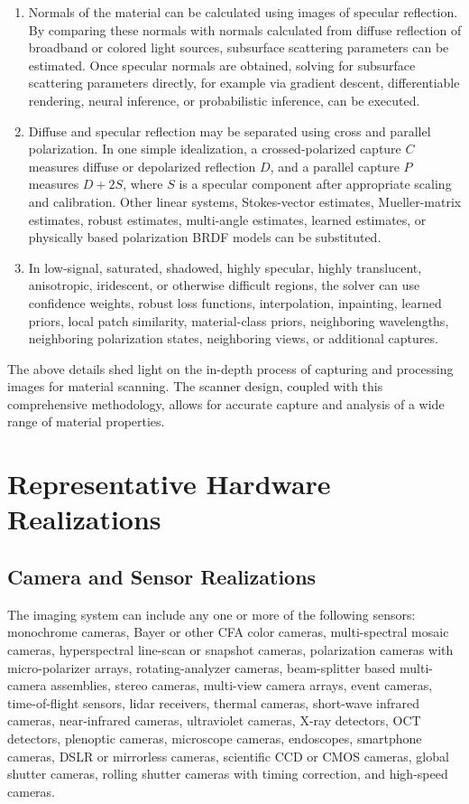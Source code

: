 \documentclass[11pt, twoside, listof=totocnumbered, bibliography=totocnumbered]{scrartcl}
\begin{document}
\begin{enumerate}
		\item Normals of the material can be calculated using images of specular reflection. By comparing these normals with normals calculated from diffuse reflection of broadband or colored light sources, subsurface scattering parameters can be estimated. Once specular normals are obtained, solving for subsurface scattering parameters directly, for example via gradient descent, differentiable rendering, neural inference, or probabilistic inference, can be executed. \cite{SSS}
		
		\item Diffuse and specular reflection may be separated using cross and parallel polarization. In one simple idealization, a crossed-polarized capture $C$ measures diffuse or depolarized reflection $D$, and a parallel capture $P$ measures $D + 2S$, where $S$ is a specular component after appropriate scaling and calibration. Other linear systems, Stokes-vector estimates, Mueller-matrix estimates, robust estimates, multi-angle estimates, learned estimates, or physically based polarization BRDF models can be substituted.
		
		\item In low-signal, saturated, shadowed, highly specular, highly translucent, anisotropic, iridescent, or otherwise difficult regions, the solver can use confidence weights, robust loss functions, interpolation, inpainting, learned priors, local patch similarity, material-class priors, neighboring wavelengths, neighboring polarization states, neighboring views, or additional captures.
	\end{enumerate}
	
	The above details shed light on the in-depth process of capturing and processing images for material scanning. The scanner design, coupled with this comprehensive methodology, allows for accurate capture and analysis of a wide range of material properties.
	
	\section{Representative Hardware Realizations}
	
	\subsection{Camera and Sensor Realizations}
	The imaging system can include any one or more of the following sensors: monochrome cameras, Bayer or other CFA color cameras, multi-spectral mosaic cameras, hyperspectral line-scan or snapshot cameras, polarization cameras with micro-polarizer arrays, rotating-analyzer cameras, beam-splitter based multi-camera assemblies, stereo cameras, multi-view camera arrays, event cameras, time-of-flight sensors, lidar receivers, thermal cameras, short-wave infrared cameras, near-infrared cameras, ultraviolet cameras, X-ray detectors, OCT detectors, plenoptic cameras, microscope cameras, endoscopes, smartphone cameras, DSLR or mirrorless cameras, scientific CCD or CMOS cameras, global shutter cameras, rolling shutter cameras with timing correction, and high-speed cameras.
	
\end{document}

